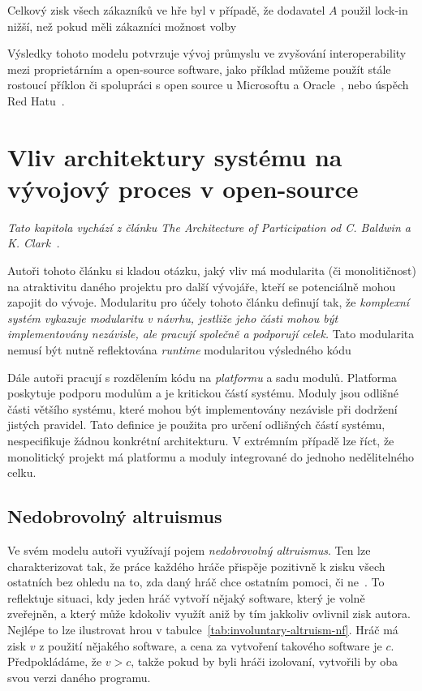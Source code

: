 \begin{multicols}{2}
	Celkový zisk všech zákazníků ve hře byl v případě, že dodavatel $A$ použil lock-in nižší, než pokud měli zákazníci možnost volby~\cite[kap. 5]{lock-in-competition}

	Výsledky tohoto modelu potvrzuje vývoj průmyslu ve zvyšování interoperability mezi proprietárním a open-source software, jako příklad můžeme použít stále rostoucí příklon či spolupráci s open source u Microsoftu a Oracle~\cite[kap. 6]{lock-in-competition}, nebo úspěch Red Hatu~\cite{redhat-growth}.

\section{Vliv architektury systému na vývojový proces v open-source}
\label{ch:architecture-opensource}
	{\em Tato kapitola vychází z článku The Architecture of Participation od C. Baldwin a K. Clark~\cite{architecture-opensource}.}

	Autoři tohoto článku si kladou otázku, jaký vliv má modularita (či monolitičnost) na atraktivitu daného projektu pro další vývojáře, kteří se potenciálně mohou zapojit do vývoje. Modularitu pro účely tohoto článku definují tak, že {\em komplexní systém vykazuje modularitu v návrhu, jestliže jeho části mohou být implementovány nezávisle, ale pracují společně a podporují celek.} Tato modularita nemusí být nutně reflektována {\em runtime} modularitou výsledného kódu~\cite[kap. 2.1]{architecture-opensource}

	Dále autoři pracují s rozdělením kódu na {\em platformu} a sadu modulů. Platforma poskytuje podporu modulům a je kritickou částí systému. Moduly jsou odlišné části většího systému, které mohou být implementovány nezávisle při dodržení jistých pravidel. Tato definice je použita pro určení odlišných částí systému, nespecifikuje žádnou konkrétní architekturu. V extrémním případě lze říct, že monolitický projekt má platformu a moduly integrované do jednoho nedělitelného celku.

	\subsection*{Nedobrovolný altruismus}
		Ve svém modelu autoři využívají pojem {\em nedobrovolný altruismus}. Ten lze charakterizovat tak, že práce každého hráče přispěje pozitivně k zisku všech ostatních bez ohledu na to, zda daný hráč chce ostatním pomoci, či ne~\cite[kap. 3]{architecture-opensource}. To reflektuje situaci, kdy jeden hráč vytvoří nějaký software, který je volně zveřejněn, a který může kdokoliv využít aniž by tím jakkoliv ovlivnil zisk autora. Nejlépe to lze ilustrovat hrou v tabulce~\ref{tab:involuntary-altruism-nf}. Hráč má zisk $v$ z použití nějakého software, a cena za vytvoření takového software je $c$. Předpokládáme, že $v > c$, takže pokud by byli hráči izolovaní, vytvořili by oba svou verzi daného programu.


\end{multicols}
